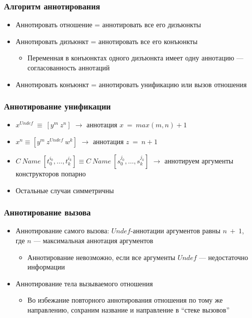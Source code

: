 \documentclass{beamer}
\begin{document}
\begin{frame}\frametitle{Алгоритм аннотирования}
\begin{itemize}
    \item Аннотировать отношение = аннотировать все его дизъюнкты
    \item Аннотировать дизъюнкт = аннотировать все его конъюнкты
        \begin{itemize}
            \item Переменная в конъюнктах одного дизъюнкта имеет одну аннотацию --- согласованность аннотаций
        \end{itemize}
    \item Аннотировать конъюнкт = аннотировать унификацию или вызов отношения
\end{itemize}
\end{frame}

\begin{frame}\frametitle{Аннотирование унификации}
\begin{itemize}
    \item $x^{Undef} \ \equiv \ [y^m \ z^n]$ $\rightarrow$ аннотация $x \ = \ max(m, n) + 1$
    \item $x^{n} \equiv [y^m \ z^{Undef} \ w^k]$ $\rightarrow$ аннотация $z \ = \ n+1$
    \item $C \ Name \ [t_0^{i_0}, \dots, t_k^{i_k}] \equiv C \ Name \ [s_0^{j_0}, \dots, s_k^{j_k}]$ $\rightarrow$ аннотируем аргументы конструкторов попарно
    \item Остальные случаи симметричны
\end{itemize}
\end{frame}

\begin{frame}[fragile]\frametitle{Аннотирование вызова}
\begin{itemize}
    \item Аннотирование самого вызова: $Undef$-аннотации аргументов равны $n \ + \ 1$, где $n$ --- максимальная аннотация аргументов
        \begin{itemize}
            \item Аннотирование невозможно, если все аргументы $Undef$ --- недостаточно информации
        \end{itemize}
    \item Аннотирование тела вызываемого отношения
        \begin{itemize}
            \item Во избежание повторного аннотирования отношения по тому же направлению, сохраним название и направление в ``стеке вызовов''
        \end{itemize}
\end{itemize}
\end{frame}
\end{document}
